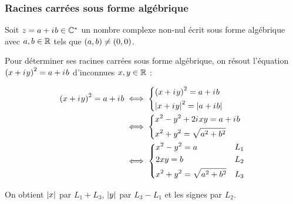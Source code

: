 \subsubsection{Racines carrées sous forme algébrique}

\begin{meth}
Soit \(z=a+i\mkern1mu b\in\mathbb{C}^*\) un nombre complexe non-nul écrit sous forme algébrique avec \(a,b\in\mathbb{R}\) tels que \(\left(a,b\right)\not=\left(0,0\right)\).

Pour déterminer ses racines carrées sous forme algébrique, on résout l'équation \(\left(x+i\mkern1mu y\right)^2=a+i\mkern1mu b\) d'inconnues \(x,y\in\mathbb{R}\) :

\begin{align*}
\left(x+i\mkern1mu y\right)^2=a+i\mkern1mu b&\iff\begin{dcases}\left(x+i\mkern1mu y\right)^2=a+i\mkern1mu b \\ \left\lvert x+i\mkern1mu y\right\rvert^2=\left\lvert a+i\mkern1mu b\right\rvert\end{dcases} \\
&\iff\begin{dcases}x^2-y^2+2i\mkern1mu xy=a+i\mkern1mu b \\ x^2+y^2=\sqrt{a^2+b^2}\end{dcases} \\
&\iff\begin{dcases}x^2-y^2=a &L_1 \\ 2xy=b &L_2 \\ x^2+y^2=\sqrt{a^2+b^2} &L_3\end{dcases}
\end{align*}

On obtient \(\left\lvert x\right\rvert\) par \(L_1+L_3\), \(\left\lvert y\right\rvert\) par \(L_3-L_1\) et les signes par \(L_2\).
\end{meth}

